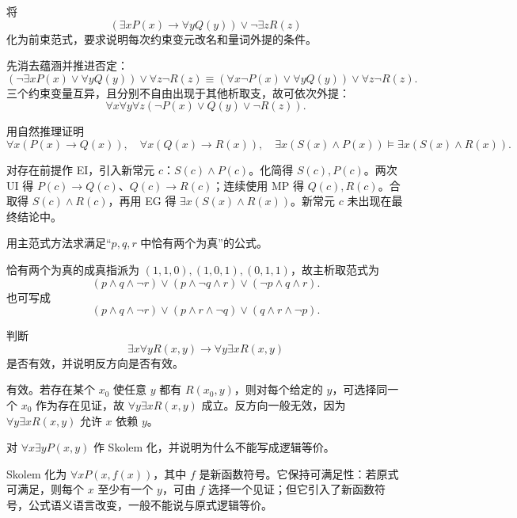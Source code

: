 \begin{exercise}[level=advanced]
将
\[
(\exists xP(x)\to\forall yQ(y))\lor\neg\exists zR(z)
\]
化为前束范式，要求说明每次约束变元改名和量词外提的条件。
\begin{solution}
先消去蕴涵并推进否定：
\[
(\neg\exists xP(x)\lor\forall yQ(y))\lor\forall z\neg R(z)
\equiv(\forall x\neg P(x)\lor\forall yQ(y))\lor\forall z\neg R(z).
\]
三个约束变量互异，且分别不自由出现于其他析取支，故可依次外提：
\[
\forall x\forall y\forall z
(\neg P(x)\lor Q(y)\lor\neg R(z)).
\]
\end{solution}
\end{exercise}

\begin{exercise}[level=advanced]
用自然推理证明
\[
\forall x(P(x)\to Q(x)),\quad
\forall x(Q(x)\to R(x)),\quad
\exists x(S(x)\land P(x))
\vDash\exists x(S(x)\land R(x)).
\]
\begin{solution}
对存在前提作 EI，引入新常元 $c$：$S(c)\land P(c)$。化简得
$S(c),P(c)$。两次 UI 得 $P(c)\to Q(c)$、$Q(c)\to R(c)$；连续使用 MP 得
$Q(c),R(c)$。合取得 $S(c)\land R(c)$，再用 EG 得
$\exists x(S(x)\land R(x))$。新常元 $c$ 未出现在最终结论中。
\end{solution}
\end{exercise}

\begin{exercise}[level=advanced]
用主范式方法求满足“$p,q,r$ 中恰有两个为真”的公式。
\begin{solution}
恰有两个为真的成真指派为 $(1,1,0),(1,0,1),(0,1,1)$，故主析取范式为
\[
(p\land q\land\neg r)\lor(p\land\neg q\land r)\lor(\neg p\land q\land r).
\]
也可写成
\[
(p\land q\land\neg r)\lor(p\land r\land\neg q)\lor(q\land r\land\neg p).
\]
\end{solution}
\end{exercise}

\begin{exercise}[level=advanced]
判断
\[
\exists x\forall yR(x,y)\to \forall y\exists xR(x,y)
\]
是否有效，并说明反方向是否有效。
\begin{solution}
有效。若存在某个 $x_0$ 使任意 $y$ 都有 $R(x_0,y)$，则对每个给定的 $y$，可选择同一个 $x_0$ 作为存在见证，故 $\forall y\exists xR(x,y)$ 成立。反方向一般无效，因为 $\forall y\exists xR(x,y)$ 允许 $x$ 依赖 $y$。
\end{solution}
\end{exercise}

\begin{exercise}[level=advanced]
对 $\forall x\exists yP(x,y)$ 作 Skolem 化，并说明为什么不能写成逻辑等价。
\begin{solution}
Skolem 化为 $\forall xP(x,f(x))$，其中 $f$ 是新函数符号。它保持可满足性：若原式可满足，则每个 $x$ 至少有一个 $y$，可由 $f$ 选择一个见证；但它引入了新函数符号，公式语义语言改变，一般不能说与原式逻辑等价。
\end{solution}
\end{exercise}

